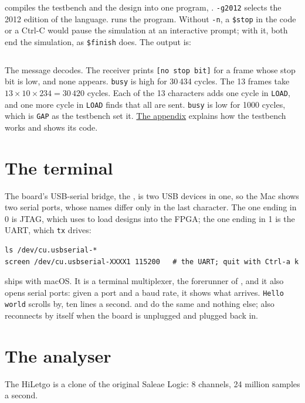 \documentclass[11pt,a4paper]{article}
\begin{document}
 compiles the testbench and the design into one program, . \texttt{-g2012} selects the 2012 edition of the language.  runs the program. Without \texttt{-n}, a \texttt{\$stop} in the code or a Ctrl-C would pause the simulation at an interactive prompt; with it, both end the simulation, as \texttt{\$finish} does. The output is:

\inputminted{text}{data/hello_tb.txt}

The message decodes. The receiver prints \texttt{[no stop bit]} for a frame whose stop bit is low, and none appears. \texttt{busy} is high for 30\,434 cycles. The 13 frames take $13 \times 10 \times 234 = 30\,420$ cycles. Each of the 13 characters adds one cycle in \texttt{LOAD}, and one more cycle in \texttt{LOAD} finds that all are sent. \texttt{busy} is low for 1000 cycles, which is \texttt{GAP} as the testbench set it. \hyperref[app:testbench]{The appendix} explains how the testbench works and shows its code.

\section*{The terminal}

The board’s USB-serial bridge, the , is two USB devices in one, so the Mac shows two serial ports, whose names differ only in the last character. The one ending in 0 is JTAG, which  uses to load designs into the FPGA; the one ending in 1 is the UART, which \texttt{tx} drives:

\begin{verbatim}
ls /dev/cu.usbserial-*
screen /dev/cu.usbserial-XXXX1 115200   # the UART; quit with Ctrl-a k
\end{verbatim}

 ships with macOS. It is a terminal multiplexer, the forerunner of , and it also opens serial ports: given a port and a baud rate, it shows what arrives. \texttt{Hello world} scrolls by, ten lines a second.  and  do the same and nothing else;  also reconnects by itself when the board is unplugged and plugged back in.

\section*{The analyser}

The HiLetgo is a clone of the original Saleae Logic: 8 channels, 24 million samples a second.
\end{document}
